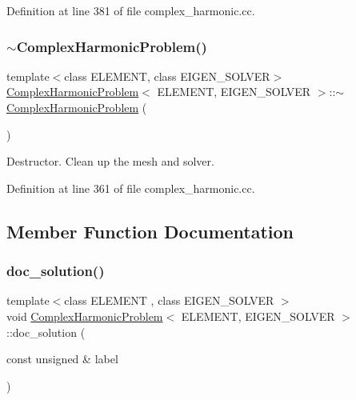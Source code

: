 Definition at line 381 of file complex\+\_\+harmonic.\+cc.

\mbox{\label{classComplexHarmonicProblem_a2222e80aab2660c62cbf01c5bba842fa}} 
\subsubsection{\texorpdfstring{$\sim$\+Complex\+Harmonic\+Problem()}{~ComplexHarmonicProblem()}}
{\footnotesize\ttfamily template$<$class E\+L\+E\+M\+E\+NT, class E\+I\+G\+E\+N\+\_\+\+S\+O\+L\+V\+ER$>$ \\
\hyperlink{classComplexHarmonicProblem}{Complex\+Harmonic\+Problem}$<$ E\+L\+E\+M\+E\+NT, E\+I\+G\+E\+N\+\_\+\+S\+O\+L\+V\+ER $>$\+::$\sim$\hyperlink{classComplexHarmonicProblem}{Complex\+Harmonic\+Problem} (\begin{DoxyParamCaption}{ }\end{DoxyParamCaption})\hspace{0.3cm}{\ttfamily [inline]}}



Destructor. Clean up the mesh and solver. 



Definition at line 361 of file complex\+\_\+harmonic.\+cc.



\subsection{Member Function Documentation}
\mbox{\label{classComplexHarmonicProblem_a984616c738c9bc14a93ad825a87b0051}} 
\subsubsection{\texorpdfstring{doc\+\_\+solution()}{doc\_solution()}}
{\footnotesize\ttfamily template$<$class E\+L\+E\+M\+E\+NT , class E\+I\+G\+E\+N\+\_\+\+S\+O\+L\+V\+ER $>$ \\
void \hyperlink{classComplexHarmonicProblem}{Complex\+Harmonic\+Problem}$<$ E\+L\+E\+M\+E\+NT, E\+I\+G\+E\+N\+\_\+\+S\+O\+L\+V\+ER $>$\+::doc\+\_\+solution (\begin{DoxyParamCaption}\item[{const unsigned \&}]{label }\end{DoxyParamCaption})}



